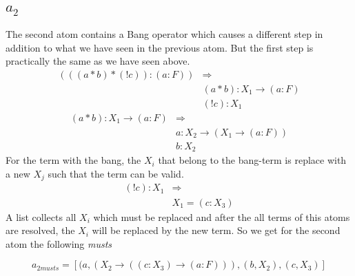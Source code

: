 \subsection[Second atom]{$a_2$}
%
The second atom contains a Bang operator which causes a different step in addition to what we have seen in the previous atom. But the first step is practically the same as we have seen above.
\begin{equation}\label{example_atom2_must}
\begin{split}
	(((a * b)*(! c)):(a:F)) & \Rightarrow \\
	& (a * b) : X_1 \rightarrow (a:F) \\
	& (! c) : X_1
\end{split}
\end{equation}
\begin{equation}\label{example_atom2_must2}
\begin{split}
	(a * b) : X_1 \rightarrow (a:F) & \Rightarrow \\
	& a: X_2 \rightarrow (X_1 \rightarrow (a:F)) \\
	& b: X_2
\end{split}
\end{equation}
For the term with the bang, the $X_i$ that belong to the bang-term is replace with a new $X_j$ such that the term can be valid. 
\begin{equation}\label{example_atom2_must3}
\begin{split}
	(! c) : X_1 & \Rightarrow \\
	& X_1 = (c:X_3) 
\end{split}
\end{equation}
A list collects all $X_i$ which must be replaced and after the all terms of this atoms are resolved, the $X_i$ will be replaced by the new term. So we get for the second atom the following \emph{musts}

\begin{equation}
	a_{2 musts} = [(a, (X_2 \rightarrow ((c:X_3) \rightarrow (a:F))), (b, X_2), (c, X_3)]
\end{equation}

